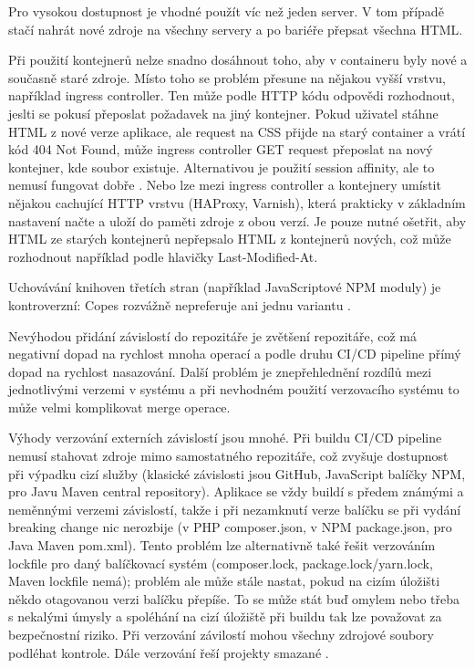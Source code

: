             Pro vysokou dostupnost je vhodné použít víc než jeden server. V tom případě stačí nahrát nové zdroje na všechny servery a po bariéře přepsat všechna HTML.


            Při použití kontejnerů nelze snadno dosáhnout toho, aby v containeru byly nové a současně staré zdroje. Místo toho se problém přesune na nějakou vyšší vrstvu, například ingress controller. Ten může podle HTTP kódu odpovědi rozhodnout, jeslti se pokusí přeposlat požadavek na jiný kontejner. Pokud uživatel stáhne HTML z nové verze aplikace, ale request na CSS přijde na starý container a vrátí kód 404 Not Found, může ingress controller GET request přeposlat na nový kontejner, kde soubor existuje. Alternativou je použití session affinity, ale to nemusí fungovat dobře . Nebo lze mezi ingress controller a kontejnery umístit nějakou cachující HTTP vrstvu (HAProxy, Varnish), která prakticky v základním nastavení načte a uloží do paměti zdroje z obou verzí. Je pouze nutné ošetřit, aby HTML ze starých kontejnerů nepřepsalo HTML z kontejnerů nových, což může rozhodnout například podle hlavičky Last-Modified-At.


            Uchovávání knihoven třetích stran (například JavaScriptové NPM  moduly) je kontroverzní: Copes rozvážně nepreferuje ani jednu variantu \cite{copes-commit-npm} .

             Nevýhodou přidání závislostí do repozitáře je zvětšení repozitáře, což má negativní dopad na rychlost mnoha operací a podle druhu CI/CD pipeline přímý dopad na rychlost nasazování. Další problém je znepřehlednění rozdílů mezi jednotlivými verzemi v systému a při nevhodném použití verzovacího systému to může velmi komplikovat merge operace.

             Výhody verzování externích závislostí jsou mnohé. Při buildu CI/CD pipeline nemusí stahovat zdroje mimo samostatného repozitáře, což zvyšuje dostupnost při výpadku cizí služby (klasické závislosti jsou GitHub, JavaScript balíčky NPM, pro Javu Maven central repository). Aplikace se vždy buildí s předem známými a neměnnými verzemi závislostí, takže i při nezamknutí verze balíčku se při vydání breaking change nic nerozbije (v PHP composer.json, v NPM package.json, pro Java Maven pom.xml). Tento problém lze alternativně také řešit verzováním lockfile pro daný balíčkovací systém (composer.lock, package.lock/yarn.lock, Maven lockfile nemá); problém ale může stále nastat, pokud na cizím úložišti někdo otagovanou verzi balíčku přepíše. To se může stát buď omylem nebo třeba s nekalými úmysly a spoléhání na cizí úložiště při buildu tak lze považovat za bezpečnostní riziko. Při verzování závilostí mohou všechny zdrojové soubory podléhat kontrole. Dále verzování řeší projekty smazané \cite{williams-left-pad}.

